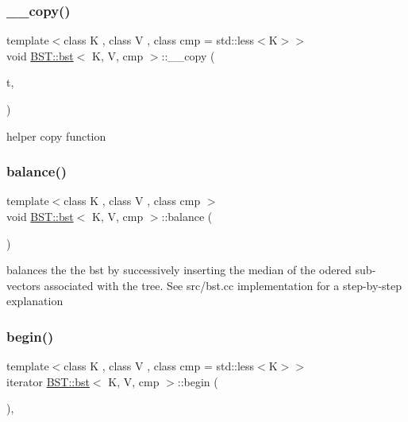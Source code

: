 \subsubsection{\texorpdfstring{\+\_\+\+\_\+copy()}{\_\_copy()}}
{\footnotesize\ttfamily template$<$class K , class V , class cmp  = std\+::less$<$\+K$>$$>$ \\
void \hyperlink{classBST_1_1bst}{B\+S\+T\+::bst}$<$ K, V, cmp $>$\+::\+\_\+\+\_\+copy (\begin{DoxyParamCaption}\item[{const \hyperlink{classBST_1_1bst}{bst}$<$ K, V, cmp $>$ \&}]{t,  }\item[{std\+::unique\+\_\+ptr$<$ node\+\_\+type $>$ \&}]{ }\end{DoxyParamCaption})}

helper copy function \mbox{\label{classBST_1_1bst_af4df6a5c2ae79c5133688b3e117d622b}} 
\subsubsection{\texorpdfstring{balance()}{balance()}}
{\footnotesize\ttfamily template$<$class K , class V , class cmp $>$ \\
void \hyperlink{classBST_1_1bst}{B\+S\+T\+::bst}$<$ K, V, cmp $>$\+::balance (\begin{DoxyParamCaption}{ }\end{DoxyParamCaption})}

balances the the bst by successively inserting the median of the odered sub-\/vectors associated with the tree. See src/bst.\+cc implementation for a step-\/by-\/step explanation \mbox{\label{classBST_1_1bst_a998e86071c043c562ac906197cbf015e}} 
\subsubsection{\texorpdfstring{begin()}{begin()}\hspace{0.1cm}{\footnotesize\ttfamily [1/2]}}
{\footnotesize\ttfamily template$<$class K , class V , class cmp  = std\+::less$<$\+K$>$$>$ \\
iterator \hyperlink{classBST_1_1bst}{B\+S\+T\+::bst}$<$ K, V, cmp $>$\+::begin (\begin{DoxyParamCaption}{ }\end{DoxyParamCaption})\hspace{0.3cm}{\ttfamily [inline]}, {\ttfamily [noexcept]}}


